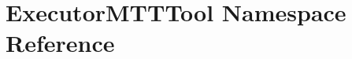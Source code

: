 \hypertarget{namespaceExecutorMTTTool}{\section{Executor\-M\-T\-T\-Tool Namespace Reference}
\label{namespaceExecutorMTTTool}
}
